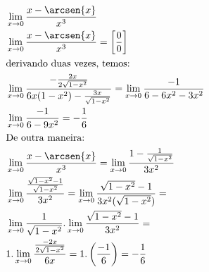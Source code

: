 \begin{ex}
\begin{align}
&\lim_{x\rightarrow 0} \frac{x-\arcsen{x}}{x^3}\nonumber\\
&\lim_{x\rightarrow 0} \frac{x-\arcsen{x}}{x^3}=\left[\frac{0}{0}\right]\nonumber\\
&\text{derivando duas vezes, temos:}\nonumber\\
&\lim_{x\rightarrow 0} \frac{-\frac{2x}{2\sqrt{1-x^2}}}{6x(1-x^2)-\frac{3x}{\sqrt{1-x^2}}}=\lim_{x\rightarrow 0} \frac{-1}{6-6x^2-3x^2}\nonumber\\
&\lim_{x\rightarrow 0} \frac{-1}{6-9x^2}=-\frac{1}{6}\nonumber\\
&\text{De outra maneira:}\nonumber\\
&\lim_{x\rightarrow 0} \frac{x-\arcsen{x}}{x^3}=\lim_{x\rightarrow 0} \frac{1-\frac{1}{\sqrt{1-x^2}}}{3x^2}\nonumber\\
&\lim_{x\rightarrow 0} \frac{\frac{\sqrt{1-x^2}-1}{\sqrt{1-x^2}}}{3x^2}=\lim_{x\rightarrow 0} \frac{\sqrt{1-x^2}-1}{3x^2(\sqrt{1-x^2})}=\nonumber\\
&\lim_{x\rightarrow 0} \frac{1}{\sqrt{1-x^2}}.\lim_{x\rightarrow 0} \frac{\sqrt{1-x^2}-1}{3x^2}=\nonumber\\
&1.\lim_{x\rightarrow 0} \frac{\frac{-2x}{2\sqrt{1-x^2}}}{6x}=1.\left(\frac{-1}{6}\right)=-\frac{1}{6}\nonumber
\end{align}
\end{ex} 